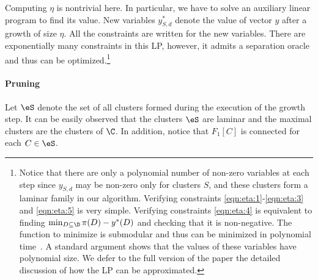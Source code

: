 Computing $\eta$ is nontrivial here.
In particular, we have to solve an auxiliary linear program to find its value.
New variables $y^\ast_{S,d}$ denote the value of vector $y$ after a growth of
size $\eta$.  All the constraints are written for the new variables.
There are exponentially many constraints in this LP, however,
it admits a separation oracle and thus can be optimized.\footnote{
Notice that there are only a polynomial number of non-zero variables at each step
since $y_{S,d}$ may be non-zero only for clusters $S$, and these clusters form a
laminar family in our algorithm.
Verifying constraints \eqref{eqn:eta:1}-\eqref{eqn:eta:3} and \eqref{eqn:eta:5} is very simple.
Verifying constraints \eqref{eqn:eta:4} is equivalent to finding 
$\min_{D\subseteq \D} \pi(D) - y^\ast(D)$ and checking that it is non-negative.
The function to minimize is submodular and thus can be minimized in polynomial time~\cite{IFF00}.
A standard argument shows that the values of these variables have polynomial size.
We defer to the full version of the paper the detailed discussion of
how the LP can be approximated. 
} 











\paragraph{Pruning}
Let $\eS$ denote the set of all clusters formed during the execution
of the growth step.  It can be easily observed that the clusters $\eS$
are laminar and the maximal clusters are the clusters of $\C$. 
In addition, notice that $F_1[C]$ is connected for each $C\in\eS$.
 

